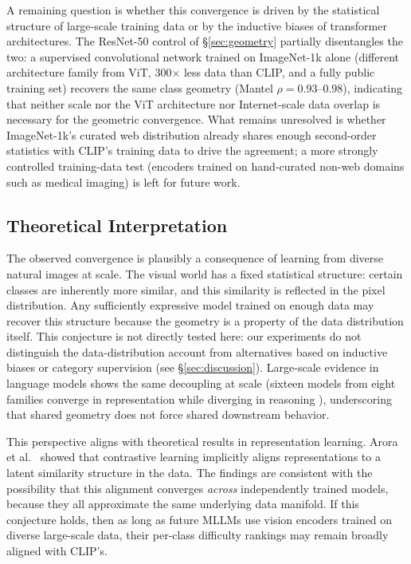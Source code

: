 \documentclass[a4paper,fleqn]{cas-sc}
\begin{document}
A remaining question is whether this convergence is driven by the statistical structure of large-scale training data or by the inductive biases of transformer architectures. The ResNet-50 control of \S\ref{sec:geometry} partially disentangles the two: a supervised convolutional network trained on ImageNet-1k alone (different architecture family from ViT, 300$\times$ less data than CLIP, and a fully public training set) recovers the same class geometry (Mantel $\rho=0.93$--$0.98$), indicating that neither scale nor the ViT architecture nor Internet-scale data overlap is necessary for the geometric convergence. What remains unresolved is whether ImageNet-1k's curated web distribution already shares enough second-order statistics with CLIP's training data to drive the agreement; a more strongly controlled training-data test (encoders trained on hand-curated non-web domains such as medical imaging) is left for future work.

\subsection{Theoretical Interpretation}

The observed convergence is plausibly a consequence of learning from diverse natural images at scale. The visual world has a fixed statistical structure: certain classes are inherently more similar, and this similarity is reflected in the pixel distribution. Any sufficiently expressive model trained on enough data may recover this structure because the geometry is a property of the data distribution itself. This conjecture is not directly tested here: our experiments do not distinguish the data-distribution account from alternatives based on inductive biases or category supervision (see \S\ref{sec:discussion}). Large-scale evidence in language models shows the same decoupling at scale (sixteen models from eight families converge in representation while diverging in reasoning \cite{usama2026convergence}), underscoring that shared geometry does not force shared downstream behavior.

This perspective aligns with theoretical results in representation learning. Arora et al.~\cite{arora2019fine} showed that contrastive learning implicitly aligns representations to a latent similarity structure in the data. The findings are consistent with the possibility that this alignment converges \emph{across} independently trained models, because they all approximate the same underlying data manifold. If this conjecture holds, then as long as future MLLMs use vision encoders trained on diverse large-scale data, their per-class difficulty rankings may remain broadly aligned with CLIP's.
\end{document}

